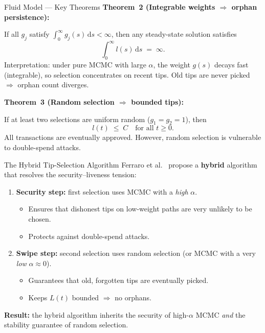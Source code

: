 \documentclass[aspectratio=169]{beamer}
\begin{document}
\begin{frame}{Fluid Model --- Key Theorems}
  \textbf{Theorem~2 (Integrable weights $\Rightarrow$ orphan persistence):}

  If all $g_j$ satisfy $\displaystyle\int_0^\infty g_j(s)\,\mathrm{d}s < \infty$, then any steady-state solution satisfies
  \[
    \int_0^\infty l(s)\,\mathrm{d}s \;=\; \infty.
  \]
  Interpretation: under pure MCMC with large $\alpha$, the weight $g(s)$ decays fast (integrable), so selection concentrates on recent tips.  Old tips are never picked $\Rightarrow$ orphan count diverges.

  \bigskip
  \textbf{Theorem~3 (Random selection $\Rightarrow$ bounded tips):}

  If at least two selections are uniform random ($g_1=g_2=1$), then
  \[
    l(t) \;\le\; C \quad\text{for all } t\ge 0.
  \]
  All transactions are eventually approved.  However, random selection is vulnerable to double-spend attacks.
\end{frame}

\begin{frame}{The Hybrid Tip-Selection Algorithm}
  Ferraro et al.~\cite{ferraro2020} propose a \textbf{hybrid} algorithm that resolves the security--liveness tension:

  \bigskip
  \begin{enumerate}
    \item \textbf{Security step:} first selection uses MCMC with a \emph{high} $\alpha$.
      \begin{itemize}
        \item Ensures that dishonest tips on low-weight paths are very unlikely to be chosen.
        \item Protects against double-spend attacks.
      \end{itemize}

    \bigskip
    \item \textbf{Swipe step:} second selection uses random selection (or MCMC with a very \emph{low} $\alpha \approx 0$).
      \begin{itemize}
        \item Guarantees that old, forgotten tips are eventually picked.
        \item Keeps $L(t)$ bounded $\Rightarrow$ no orphans.
      \end{itemize}
  \end{enumerate}

  \bigskip
  \textbf{Result:}  the hybrid algorithm inherits the security of high-$\alpha$ MCMC \emph{and} the stability guarantee of random selection.
\end{frame}
\end{document}
